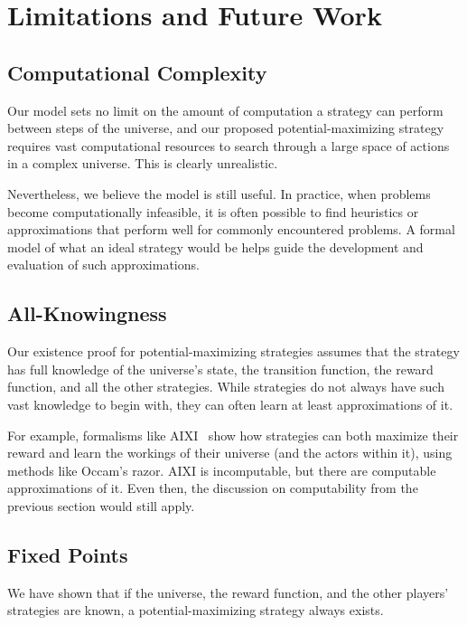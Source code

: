 \section{Limitations and Future Work}
\label{sec:limitations}

\subsection{Computational Complexity}

Our model sets no limit on the amount of computation a strategy can perform
between steps of the universe, and our proposed potential-maximizing strategy
requires vast computational resources to search through a large space of
actions in a complex universe. This is clearly unrealistic.

Nevertheless, we believe the model is still useful. In practice, when problems
become computationally infeasible, it is often possible to find heuristics or
approximations that perform well for commonly encountered problems. A formal
model of what an ideal strategy would be helps guide the development and
evaluation of such approximations.

\subsection{All-Knowingness}

Our existence proof for potential-maximizing strategies assumes that the
strategy has full knowledge of the universe's state, the transition function,
the reward function, and all the other strategies. While strategies do not
always have such vast knowledge to begin with, they can often learn at least
approximations of it.

For example, formalisms like AIXI~\citep{Hutter:04uaibook} show how strategies
can both maximize their reward and learn the workings of their universe (and the
actors within it), using methods like Occam's razor. AIXI is incomputable, but
there are computable approximations of it. Even then, the discussion on
computability from the previous section would still apply.

\subsection{Fixed Points}

We have shown that if the universe, the reward function, and the other players'
strategies are known, a potential-maximizing strategy always exists.

